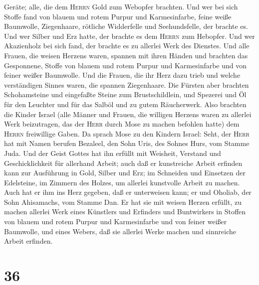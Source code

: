 Geräte; alle, die dem \textsc{Herrn} Gold zum Webopfer brachten.
 Und wer bei sich Stoffe fand von blauem und rotem Purpur
und Karmesinfarbe, feine weiße Baumwolle, Ziegenhaare, rötliche
Widderfelle und Seehundsfelle, der brachte es.  Und wer
Silber und Erz hatte, der brachte es dem \textsc{Herrn} zum Hebopfer.
Und wer Akazienholz bei sich fand, der brachte es zu allerlei Werk des
Dienstes.  Und alle Frauen, die weisen Herzens waren,
spannen mit ihren Händen und brachten das Gesponnene, Stoffe von blauem
und rotem Purpur und Karmesinfarbe und von feiner weißer Baumwolle.
 Und die Frauen, die ihr Herz dazu trieb und welche
verständigen Sinnes waren, die spannen Ziegenhaare.  Die
Fürsten aber brachten Schohamsteine und eingefaßte Steine zum
Brustschildlein,  und Spezerei und Öl für den Leuchter
und für das Salböl und zu gutem Räucherwerk.  Also
brachten die Kinder Israel (alle Männer und Frauen, die willigen Herzens
waren zu allerlei Werk beizutragen, das der \textsc{Herr} durch Mose zu
machen befohlen hatte) dem \textsc{Herrn} freiwillige Gaben.
 Da sprach Mose zu den Kindern Israel: Seht, der
\textsc{Herr} hat mit Namen berufen Bezaleel, den Sohn Uris, des Sohnes
Hurs, vom Stamme Juda.  Und der Geist Gottes hat ihn
erfüllt mit Weisheit, Verstand und Geschicklichkeit für allerhand
Arbeit;  auch daß er kunstreiche Arbeit erfinden kann zur
Ausführung in Gold, Silber und Erz;  im Schneiden und
Einsetzen der Edelsteine, im Zimmern des Holzes, um allerlei kunstvolle
Arbeit zu machen.  Auch hat er ihm ins Herz gegeben, daß
er unterweisen kann; er und Oholiab, der Sohn Ahisamachs, vom Stamme
Dan.  Er hat sie mit weisen Herzen erfüllt, zu machen
allerlei Werk eines Künstlers und Erfinders und Buntwirkers in Stoffen
von blauem und rotem Purpur und Karmesinfarbe und von feiner weißer
Baumwolle, und eines Webers, daß sie allerlei Werke machen und
sinnreiche Arbeit erfinden.

\hypertarget{section-35}{%
\section{36}\label{section-35}}


